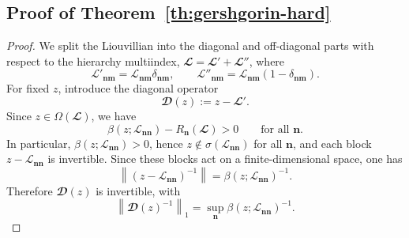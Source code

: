\documentclass{SciPost}
\begin{document}
\subsection{Proof of Theorem~\ref{th:gershgorin-hard}}
\label{sec:th-gershgorin-hard-proof}
\begin{proof}
We split the Liouvillian into the diagonal and off-diagonal parts with respect to the hierarchy multiindex,
$\mathbfcal L = \mathbfcal L' + \mathbfcal L''$,
where
\begin{equation}
    \mathcal L'_{\bm n\bm m}
    =
    \mathcal L_{\bm n\bm m}\delta_{\bm n\bm m},
    \qquad
    \mathcal L''_{\bm n\bm m}
    =
    \mathcal L_{\bm n\bm m}(1-\delta_{\bm n\bm m}).
\end{equation}
For fixed \(z\), introduce the diagonal operator
\begin{equation}
    \mathbfcal D(z) := z - \mathbfcal L'.
\end{equation}
    Since \(z \in \Omega(\mathbfcal L)\), we have
\begin{equation}
    \beta(z;\mathcal L_{\bm{nn}}) - R_{\bm n}(\mathbfcal L) > 0
    \qquad
    \text{for all }\bm n.
    \label{eq:beta-greater}
\end{equation}
    In particular, \(\beta(z;\mathcal L_{\bm{nn}})>0\), hence \(z \notin \sigma(\mathcal L_{\bm n\bm n})\) for all \(\bm n\), and each block $z-\mathcal L_{\bm n\bm n}$
is invertible. Since these blocks act on a finite-dimensional space, one has
\begin{equation}
    \left\|
    (z-\mathcal L_{\bm n\bm n})^{-1}
    \right\|
    =
    \beta(z; \mathcal L_{\bm{nn}})^{-1}.
    \label{eq:block-inverse-beta}
\end{equation}
Therefore \(\mathbfcal D(z)\) is invertible, with
\begin{equation}
    \left \|\mathbfcal D(z)^{-1} \right \|_1
    =
    \sup_{\bm n}\beta(z; \mathcal L_{\bm{nn}})^{-1}.
\end{equation}


\end{proof}
\end{document}

